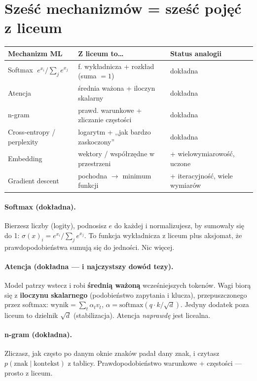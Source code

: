 \documentclass[11pt]{article}
\begin{document}
\section{Sześć mechanizmów = sześć pojęć z liceum}
\begin{center}
\begin{tabular}{@{}lll@{}}
\toprule
\textbf{Mechanizm ML} & \textbf{Z liceum to\ldots} & \textbf{Status analogii} \\
\midrule
Softmax $\;e^{x_i}/\sum_j e^{x_j}$ & f. wykładnicza + rozkład (suma $=1$) & dokładna \\
Atencja & średnia ważona + iloczyn skalarny & dokładna \\
n-gram & prawd. warunkowe + zliczanie częstości & dokładna \\
Cross-entropy / perplexity & logarytm + ,,jak bardzo zaskoczony'' & dokładna \\
Embedding & wektory / współrzędne w przestrzeni & + wielowymiarowość, uczone \\
Gradient descent & pochodna $\to$ minimum funkcji & + iteracyjność, wiele wymiarów \\
\bottomrule
\end{tabular}
\end{center}

\paragraph{Softmax (dokładna).} Bierzesz liczby (logity), podnosisz $e$ do każdej i normalizujesz, by sumowały
się do 1: $\sigma(x)_i = e^{x_i}/\sum_j e^{x_j}$. To funkcja wykładnicza z liceum plus aksjomat, że
prawdopodobieństwa sumują się do jedności. Nic więcej.

\paragraph{Atencja (dokładna --- i najczystszy dowód tezy).} Model patrzy wstecz i robi \textbf{średnią ważoną}
wcześniejszych tokenów. Wagi biorą się z \textbf{iloczynu skalarnego} (podobieństwo zapytania i klucza),
przepuszczonego przez softmax: $\text{wynik}=\sum_t \alpha_t v_t$, $\alpha=\mathrm{softmax}(q\!\cdot\!k/\sqrt{d})$.
Jedyny dodatek poza liceum to dzielnik $\sqrt{d}$ (stabilizacja). Atencja \emph{naprawdę} jest licealna.

\paragraph{n-gram (dokładna).} Zliczasz, jak często po danym oknie znaków padał dany znak, i czytasz
$p(\text{znak}\mid\text{kontekst})$ z tablicy. Prawdopodobieństwo warunkowe + częstości --- prosto z liceum.
\end{document}
